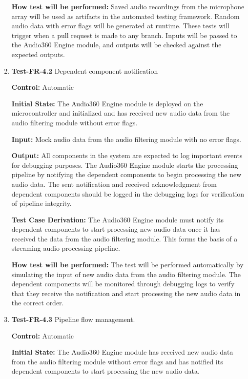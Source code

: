 \documentclass[12pt, titlepage]{article}
\begin{document}
\begin{enumerate}
\textbf{How test will be performed:}
Saved audio recordings from the microphone array will be used as artifacts in 
the automated testing framework. Random audio data with error flags will be
generated at runtime. These tests will trigger when a pull request is made to 
any branch. Inputs will be passed to the Audio360 Engine module, and outputs
will be checked against the expected outputs. 

\item{\textbf{Test-FR-4.2} Dependent component notification\\}

\textbf{Control:} Automatic

\textbf{Initial State:}
The Audio360 Engine module is deployed on the microcontroller and initialized 
and has received new audio data from the audio filtering module without error
flags.

\textbf{Input:}
Mock audio data from the audio filtering module with no error flags.

\textbf{Output:}
All components in the system are expected to log important events for debugging
purposes. The Audio360 Engine module starts the processing pipeline by 
notifying the dependent components to begin processing the new audio data. The
sent notification and received acknowledgment from dependent components should
be logged in the debugging logs for verification of pipeline integrity. 

\textbf{Test Case Derivation:}
The Audio360 Engine module must notify its dependent components to start
processing new audio data once it has received the data from the audio filtering
module. This forms the basis of a streaming audio processing pipeline.

\textbf{How test will be performed:}
The test will be performed automatically by simulating the input of new audio data
from the audio filtering module. The dependent components will be monitored
through debugging logs to verify that they receive the notification and start
processing the new audio data in the correct order. 

\item{\textbf{Test-FR-4.3} Pipeline flow management.\\}

\textbf{Control:} Automatic

\textbf{Initial State:}
The Audio360 Engine module has received new audio data from the audio filtering
module without error flags and has notified its dependent components to start
processing the new audio data.


\end{enumerate}
\end{document}
